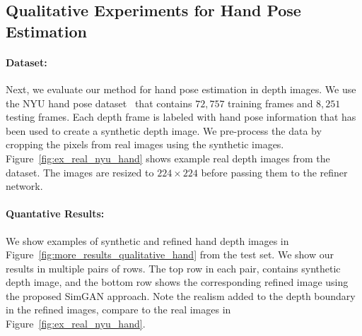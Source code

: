 \documentclass[10pt,twocolumn,letterpaper]{article}
\begin{document}
\subsection*{Qualitative Experiments for Hand Pose Estimation}
\paragraph{Dataset:} Next, we evaluate our method for hand pose estimation in depth images. 
We use the NYU hand pose dataset~\cite{tompson14NYU} that contains $72,757$ training frames and $8,251$ testing frames.
Each depth frame is labeled with hand pose information that has been used to create a synthetic depth image. 
We pre-process the data by cropping the pixels from real images using the synthetic images. 
Figure~\ref{fig:ex_real_nyu_hand} shows example real depth images from the dataset. 
The images are resized to $224 \times 224$ before passing them to the refiner network.


\paragraph{Quantative Results:} We show examples of synthetic and refined hand depth images in Figure~\ref{fig:more_results_qualitative_hand} from the test set. We show our results in multiple pairs of rows. The top row in each pair, contains synthetic depth image, and the bottom row shows the corresponding refined image using the proposed SimGAN approach. Note the realism added to the depth boundary in the refined images, compare to the real images in Figure~\ref{fig:ex_real_nyu_hand}.
\end{document}
